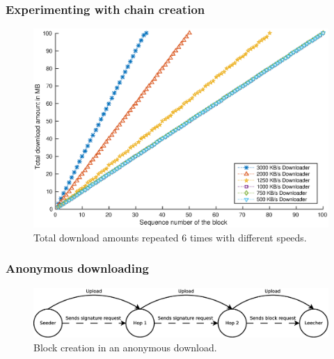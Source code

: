 \documentclass{beamer}
\begin{document}
\begin{frame}
\frametitle{Experimenting with chain creation}

\begin{figure}
\centerline{\includegraphics[scale=0.5]{images/experimentation/synthetic-simple-down.eps}}
\caption{Total download amounts repeated 6 times with different speeds.}
\end{figure}
\end{frame}

\begin{frame}
\frametitle{Anonymous downloading}

\begin{figure}
	\centerline{\includegraphics[scale=0.25]{images/experimentation/seeder-hops-downloader.eps}}
	\caption{Block creation in an anonymous download.}
	\end{figure}
\end{frame}
\end{document}

